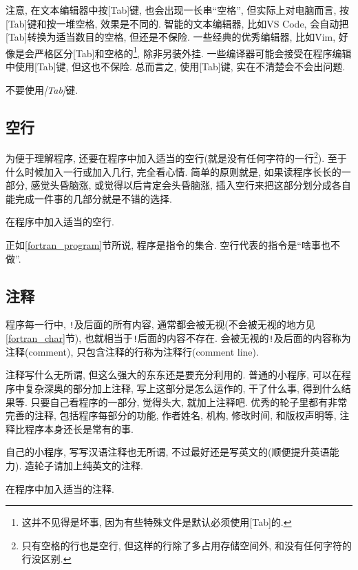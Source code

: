 注意, 在文本编辑器中按[Tab]键, 也会出现一长串``空格'', 但实际上对电脑而言, 按[Tab]键和按一堆空格, 效果是不同的. 智能的文本编辑器, 比如VS Code, 会自动把[Tab]转换为适当数目的空格, 但还是不保险. 一些经典的优秀编辑器, 比如Vim, 好像是会严格区分[Tab]和空格的\footnote{
    这并不见得是坏事, 因为有些特殊文件是默认必须使用[Tab]的.
}, 除非另装外挂. 一些编译器可能会接受在程序编辑中使用[Tab]键, 但这也不保险. 总而言之, 使用[Tab]键, 实在不清楚会不会出问题.

\begin{convention}
    不要使用\emph{[Tab]}键.
\end{convention}

\subsection{空行}

为便于理解程序, 还要在程序中加入适当的空行(就是没有任何字符的一行\footnote{
    只有空格的行也是空行, 但这样的行除了多占用存储空间外, 和没有任何字符的行没区别.
}). 至于什么时候加入一行或加入几行, 完全看心情. 简单的原则就是, 如果读程序长长的一部分, 感觉头昏脑涨, 或觉得以后肯定会头昏脑涨, 插入空行来把这部分划分成各自能完成一件事的几部分就是不错的选择.

\begin{convention}
    在程序中加入适当的空行.
\end{convention}

正如\ref{fortran_program}节所说, 程序是指令的集合. 空行代表的指令是``啥事也不做''.

\subsection{注释}

程序每一行中, \texttt{!}及后面的所有内容, 通常都会被无视(不会被无视的地方见\ref{fortran_char}节), 也就相当于\texttt{!}后面的内容不存在. 会被无视的\texttt{!}及后面的内容称为注释(comment), 只包含注释的行称为注释行(comment line).

注释写什么无所谓, 但这么强大的东东还是要充分利用的. 普通的小程序, 可以在程序中复杂深奥的部分加上注释, 写上这部分是怎么运作的, 干了什么事, 得到什么结果等. 只要自己看程序的一部分, 觉得头大, 就加上注释吧. 优秀的轮子里都有非常完善的注释, 包括程序每部分的功能, 作者姓名, 机构, 修改时间, 和版权声明等, 注释比程序本身还长是常有的事.

自己的小程序, 写写汉语注释也无所谓, 不过最好还是写英文的(顺便提升英语能力). 造轮子请加上纯英文的注释.

\begin{convention}
    在程序中加入适当的注释.
\end{convention}

